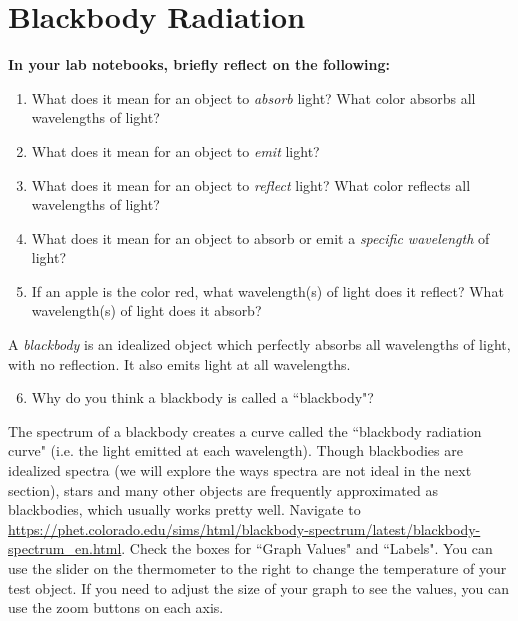 \documentclass[11pt]{article}
\begin{document}
\section{Blackbody Radiation}
\textbf{In your lab notebooks, briefly reflect on the following:}
\begin{enumerate}
    \item What does it mean for an object to \textit{absorb} light? What color absorbs all wavelengths of light?
    \item What does it mean for an object to \textit{emit} light?
    \item What does it mean for an object to \textit{reflect} light? What color reflects all wavelengths of light?
    \item What does it mean for an object to absorb or emit a \textit{specific wavelength} of light?
    \item If an apple is the color red, what wavelength(s) of light does it reflect? What wavelength(s) of light does it absorb?
\end{enumerate}
A \textit{blackbody} is an idealized object which perfectly absorbs all wavelengths of light, with no reflection. It also emits light at all wavelengths.
\begin{enumerate}
    \setcounter{enumi}{5}
    \item Why do you think a blackbody is called a ``blackbody"?
\end{enumerate}

\medskip \noindent
The spectrum of a blackbody creates a curve called the ``blackbody radiation curve" (i.e. the light emitted at each wavelength). Though blackbodies are idealized spectra (we will explore the ways spectra are not ideal in the next section), stars and many other objects are frequently approximated as blackbodies, which usually works pretty well. Navigate to \url{https://phet.colorado.edu/sims/html/blackbody-spectrum/latest/blackbody-spectrum_en.html}. Check the boxes for ``Graph Values" and ``Labels".  You can use the slider on the thermometer to the right to change the temperature of your test object.  If you need to adjust the size of your graph to see the values, you can use the zoom buttons on each axis.
\end{document}
